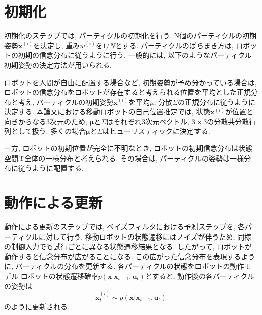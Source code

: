 \section{初期化}

初期化のステップでは, パーティクルの初期化を行う. 
N個のパーティクルの初期姿勢$\bm{x}^{(i)}$を決定し, 重み$w^{(i)}$を$1/N$とする. 
パーティクルのばらまき方は, ロボットの初期の信念分布に従うように行う. 
一般的には, 以下のようなパーティクル初期姿勢の決定方法が用いられる. 

ロボットを人間が自由に配置する場合など, 初期姿勢が予め分かっている場合は, ロボットの信念分布をロボットが存在すると考えられる位置を平均とした正規分布と考え, 
パーティクルの初期姿勢$\bm{x}^{(i)}$を平均$\mu$, 分散$\Sigma$の正規分布に従うように決定する. 
本論文における移動ロボットの自己位置推定では, 状態$\bm{x}^{(i)}$が位置と向きからなる3次元のため, $\bm{\mu}$と$\Sigma$はそれぞれ3次元ベクトル, $3\times3$の分散共分散行列として扱う. 
多くの場合$\bm{\mu}$と$\Sigma$はヒューリスティックに決定する. 

一方, ロボットの初期位置が完全に不明なとき, ロボットの初期信念分布は状態空間$\mathcal{X}$全体の一様分布と考えられる. 
その場合は, パーティクルの姿勢は一様分布に従うように配置する. 



\section{動作による更新}

動作による更新のステップでは, ベイズフィルタにおける予測ステップを, 各パーティクルに対して行う. 
移動ロボットの状態遷移にはノイズが伴うため, 同様の制御入力でも試行ごとに異なる状態遷移結果となる. 
したがって, ロボットが動作すると信念分布が広がることになる. 
この広がった信念分布を表現するように, パーティクルの分布を更新する. 
各パーティクルの状態をロボットの動作モデル
ロボットの状態遷移確率$p(\bm{x} | \bm{x}_{t-1}, \bm{u}_{t})$とすると, 
動作後の各パーティクルの姿勢は
\begin{equation}
\label{particle trans prob}
  \bm{x}^{(i)}_{t} \sim p(\bm{x} | \bm{x}_{t-1}, \bm{u}_{t})
\end{equation}
のように更新される. 


